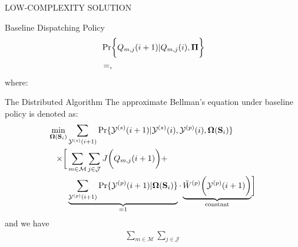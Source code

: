 \documentclass[10pt, conference, letterpaper]{IEEEtran}
\renewcommand{\vec}{\mathbf}
\DeclarePairedDelimiter{\Paren}{\bigg(}{\bigg)}
\DeclarePairedDelimiter{\Bracket}{\bigg[}{\bigg]}
\DeclarePairedDelimiter{\Brace}{\bigg\{}{\bigg\}}
\newcommand{\apSet}{\mathcal{K}}
\newcommand{\esSet}{\mathcal{M}}
\newcommand{\jSpace}{\mathcal{J}}
\newcommand{\Stat}{\mathbf{S}}
\newcommand{\Obsv}{\mathcal{Y}}
\newcommand{\Policy}{\boldsymbol{\Omega}}
\newcommand{\BPolicy}{\Policy} %
\begin{document}
\begin{section}{LOW-COMPLEXITY SOLUTION}
\begin{subsection}{Baseline Dispatching Policy}
            \begin{align}
                &\Pr \Brace{Q_{m,j}(i+1)|Q_{m,j}(i),\vec{\Pi}}
                \nonumber\\
                &=,
            \end{align}
            where:
        \end{subsection}

        \begin{subsection}{The Distributed Algorithm}
            The approximate Bellman's equation under baseline policy is denoted as:
            \begin{align}
                \min_{\BPolicy(\Stat_i)}& \sum_{\Obsv^{(s)}(i+1)} \Pr\{\Obsv^{(s)}(i+1)|\Obsv^{(s)}(i), \Obsv^{(p)}(i), \BPolicy(\Stat_i)\}
                \nonumber\\
                \times \Bracket{
                    & \sum_{m\in\esSet}\sum_{j\in\jSpace} J\Paren{Q_{m,j}(i+1)}
                    +
                    \nonumber\\
                    & \underbrace{\sum_{\Obsv^{(p)}(i+1)} \Pr\{\Obsv^{(p)}(i+1)|\BPolicy(\Stat_i)\}}_{\text{=1}}
                    \cdot \underbrace{\tilde{W}^{(p)} \Paren{\Obsv^{(p)}(i+1)}}_{\text{constant}}
                } 
            \end{align}
            and we have
            \begin{align}
                \sum_{m\in\esSet}\sum_{j\in\jSpace} 
            \end{align}


\end{subsection}
\end{section}
\end{document}
